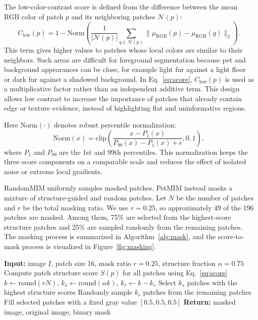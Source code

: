 \documentclass[11pt]{article}
\begin{document}
The low-color-contrast score is defined from the difference between the mean RGB color of patch $p$ and its neighboring patches $\mathcal{N}(p)$:
\begin{equation}
C_{\mathrm{low}}(p)=
1-
\mathrm{Norm}\left(
\frac{1}{|\mathcal{N}(p)|}
\sum_{q\in \mathcal{N}(p)}
\|\mu_{\mathrm{RGB}}(p)-\mu_{\mathrm{RGB}}(q)\|_2
\right).
\label{eq:contrast}
\end{equation}
This term gives higher values to patches whose local colors are similar to their neighbors. Such areas are difficult for foreground segmentation because pet and background appearances can be close, for example light fur against a light floor or dark fur against a shadowed background. In Eq.~\eqref{eq:score}, $C_{\mathrm{low}}(p)$ is used as a multiplicative factor rather than an independent additive term. This design allows low contrast to increase the importance of patches that already contain edge or texture evidence, instead of highlighting flat and uninformative regions.

Here $\mathrm{Norm}(\cdot)$ denotes robust percentile normalization:
\begin{equation}
\mathrm{Norm}(x)=
\mathrm{clip}\left(
\frac{x-P_1(x)}{P_{99}(x)-P_1(x)+\epsilon},
0,1
\right),
\label{eq:norm}
\end{equation}
where $P_1$ and $P_{99}$ are the 1st and 99th percentiles. This normalization keeps the three score components on a comparable scale and reduces the effect of isolated noise or extreme local gradients.

RandomMIM uniformly samples masked patches. PetMIM instead masks a mixture of structure-guided and random patches. Let $N$ be the number of patches and $r$ be the total masking ratio. We use $r=0.25$, so approximately 49 of the 196 patches are masked. Among them, 75\% are selected from the highest-score structure patches and 25\% are sampled randomly from the remaining patches. The masking process is summarized in Algorithm~\ref{alg:mask}, and the score-to-mask process is visualized in Figure~\ref{fig:masking}.

\begin{algorithm}[H]
\caption{PetMIM mixed masking.}
\label{alg:mask}
\begin{algorithmic}[1]
\STATE \textbf{Input:} image $I$, patch size 16, mask ratio $r=0.25$, structure fraction $\alpha=0.75$
\STATE Compute patch structure score $S(p)$ for all patches using Eq.~\eqref{eq:score}
\STATE $k \leftarrow \mathrm{round}(rN)$, $k_s \leftarrow \mathrm{round}(\alpha k)$, $k_r \leftarrow k-k_s$
\STATE Select $k_s$ patches with the highest structure scores
\STATE Randomly sample $k_r$ patches from the remaining patches
\STATE Fill selected patches with a fixed gray value $[0.5,0.5,0.5]$
\STATE \textbf{Return:} masked image, original image, binary mask
\end{algorithmic}
\end{algorithm}
\end{document}
